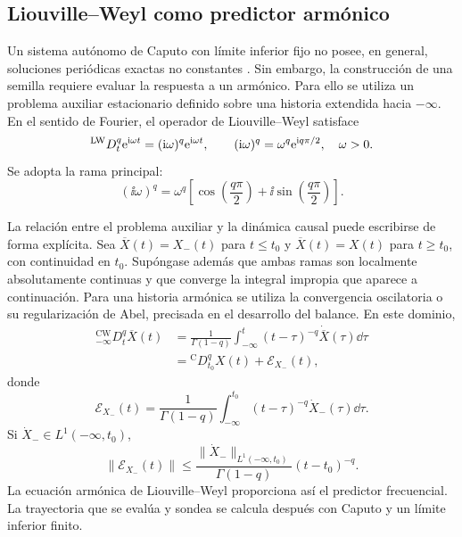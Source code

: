 \subsection{Liouville--Weyl como predictor armónico}

Un sistema autónomo de Caputo con límite inferior fijo no posee, en general,
soluciones periódicas exactas no constantes
\cite{TavazoeiHaeri2009,AreaLosadaNieto2014}. Sin embargo, la construcción de
una semilla requiere evaluar la respuesta a un armónico. Para ello se utiliza
un problema auxiliar estacionario definido sobre una historia extendida hacia
\(-\infty\). En el sentido de Fourier, el operador de Liouville--Weyl satisface
\cite{Vigue2019}
\begin{equation}
{}^{\mathrm{LW}}D_t^q\mathrm e^{\mathrm{i}\omega t}
=(\mathrm{i}\omega)^q\mathrm e^{\mathrm{i}\omega t},
\qquad
(\mathrm{i}\omega)^q
=\omega^q\mathrm e^{\mathrm{i} q\pi/2},
\quad \omega>0.
\label{eq:lw_armonico}
\end{equation}
Se adopta la rama principal:
\begin{equation}
(\ii\omega)^q
=\omega^q\left[
\cos\left(\frac{q\pi}{2}\right)
+\ii\sin\left(\frac{q\pi}{2}\right)
\right].
\label{eq:rama_principal}
\end{equation}

La relación entre el problema auxiliar y la dinámica causal puede escribirse
de forma explícita. Sea \(\overline X(t)=X_-(t)\) para \(t\leq t_0\) y
\(\overline X(t)=X(t)\) para \(t\geq t_0\), con continuidad en \(t_0\).
Supóngase además que ambas ramas son localmente absolutamente continuas
y que converge la integral impropia que aparece a continuación.
Para una historia armónica se utiliza la convergencia oscilatoria o su
regularización de Abel, precisada en el desarrollo del balance.
En este dominio,
\begin{equation}
\begin{aligned}
{}_{-\infty}^{\mathrm{CW}}D_t^q\overline X(t)
&=
\frac{1}{\Gamma(1-q)}
\int_{-\infty}^{t}(t-\tau)^{-q}\dot{\overline X}(\tau)\dd\tau\\
&={}^{\mathrm C}D_{t_0}^{q}X(t)+\mathcal E_{X_-}(t),
\end{aligned}
\label{eq:puente_weyl_caputo}
\end{equation}
donde
\begin{equation}
\mathcal E_{X_-}(t)=
\frac{1}{\Gamma(1-q)}
\int_{-\infty}^{t_0}(t-\tau)^{-q}\dot X_-(\tau)\dd\tau.
\label{eq:memoria_previa}
\end{equation}
Si \(\dot X_-\in L^1(-\infty,t_0)\),
\begin{equation}
\|\mathcal E_{X_-}(t)\|
\leq
\frac{\|\dot X_-\|_{L^1(-\infty,t_0)}}{\Gamma(1-q)}
(t-t_0)^{-q}.
\label{eq:cota_memoria_previa}
\end{equation}
La ecuación armónica de Liouville--Weyl proporciona así el predictor
frecuencial. La trayectoria que se evalúa y sondea se calcula después con
Caputo y un límite inferior finito.

